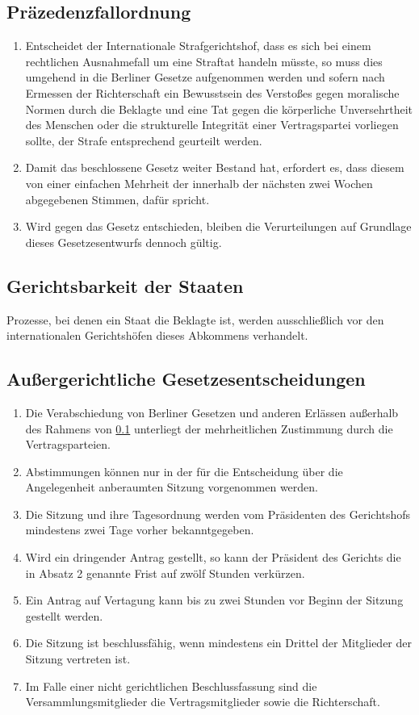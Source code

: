 \documentclass{article}
\begin{document}
\subsection{Präzedenzfallordnung}\label{prec}
\begin{enumerate}[(1)]
    \item Entscheidet der Internationale Strafgerichtshof, dass es sich bei einem rechtlichen Ausnahmefall um eine Straftat handeln müsste, so muss dies umgehend in die Berliner Gesetze aufgenommen werden und sofern nach Ermessen der Richterschaft ein Bewusstsein des Verstoßes gegen moralische Normen durch die Beklagte und eine Tat gegen die körperliche Unversehrtheit des Menschen oder die strukturelle Integrität einer Vertragspartei vorliegen sollte, der Strafe entsprechend geurteilt werden.
    \item Damit das beschlossene Gesetz weiter Bestand hat, erfordert es, dass diesem von einer einfachen Mehrheit der innerhalb der nächsten zwei Wochen abgegebenen Stimmen, dafür spricht.
    \item Wird gegen das Gesetz entschieden, bleiben die Verurteilungen auf Grundlage dieses Gesetzesentwurfs dennoch gültig.
\end{enumerate}

\subsection{Gerichtsbarkeit der Staaten}
Prozesse, bei denen ein Staat die Beklagte ist, werden ausschließlich vor den internationalen Gerichtshöfen dieses Abkommens verhandelt.

\subsection{Außergerichtliche Gesetzesentscheidungen}
\begin{enumerate}[(1)]
    \item Die Verabschiedung von Berliner Gesetzen und anderen Erlässen außerhalb des Rahmens von \ref{prec} unterliegt der mehrheitlichen Zustimmung durch die Vertragsparteien.
    \item Abstimmungen können nur in der für die Entscheidung über die Angelegenheit anberaumten Sitzung vorgenommen werden.
    \item Die Sitzung und ihre Tagesordnung werden vom Präsidenten des Gerichtshofs mindestens zwei Tage vorher bekanntgegeben.
    \item Wird ein dringender Antrag gestellt, so kann der Präsident des Gerichts die in Absatz 2 genannte Frist auf zwölf Stunden verkürzen.
    \item Ein Antrag auf Vertagung kann bis zu zwei Stunden vor Beginn der Sitzung gestellt werden.
    \item Die Sitzung ist beschlussfähig, wenn mindestens ein Drittel der Mitglieder der Sitzung vertreten ist.
    \item Im Falle einer nicht gerichtlichen Beschlussfassung sind die Versammlungsmitglieder die Vertragsmitglieder sowie die Richterschaft.
\end{enumerate}
\end{document}
